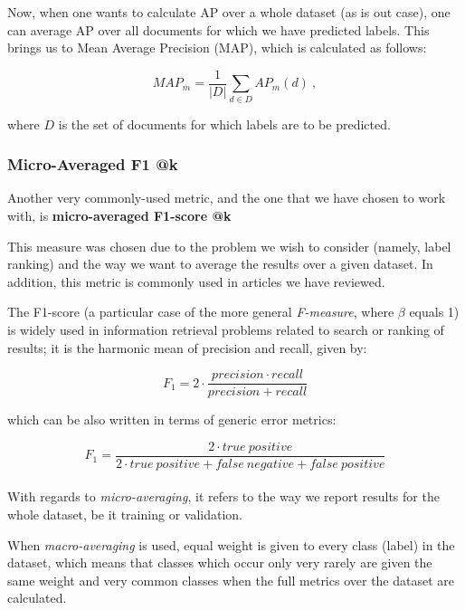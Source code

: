 Now, when one wants to calculate AP over a whole dataset (as is out case), one can average AP over all documents for which we have predicted labels. This brings us to Mean Average Precision (MAP), which is calculated as follows:

\begin{equation}
MAP_m = \frac{1}{|D|}\sum_{d \in D} AP_m(d) \ ,
\end{equation}

where $D$ is the set of documents for which labels are to be predicted.

\subsubsection{Micro-Averaged F1 @k}

Another very commonly-used metric, and the one that we have chosen to work with, is \textbf{micro-averaged F1-score @k}

This measure was chosen due to the problem we wish to consider (namely, label ranking) and the way we want to average the results over a given dataset. In addition, this metric is commonly used in articles we have reviewed.

The F1-score (a particular case of the more general \textit{F-measure}, where $\beta$ equals 1) is widely used in information retrieval problems related to search or ranking of results; it is the harmonic mean of precision and recall, given by:

\begin{equation}
F_1 = 2 \cdot \frac{precision \cdot recall}{precision + recall} 
\end{equation}

which can be also written in terms of generic error metrics:

\begin{equation}
F_1 = \frac{2 \cdot true \ positive}{2 \cdot true \ positive + false \ negative + false \ positive} 
\end{equation}\\

With regards to \textit{micro-averaging}, it refers to the way we report results for the whole dataset, be it training or validation.

When \textit{macro-averaging} is used, equal weight is given to every class (label) in the dataset, which means that classes which occur only very rarely are given the same weight and very common classes when the full metrics over the dataset are calculated.

